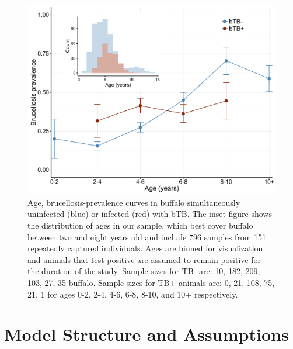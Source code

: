 \documentclass[letterpaper,12pt]{article}
\begin{document}
\begin{figure}
\begin{center}
\includegraphics[width=5in]{Figure1_ageprev}
\end{center}
\caption{Age, brucellosis-prevalence curves in buffalo simultaneously uninfected (blue) or infected (red) with bTB.  The inset figure shows the distribution of ages in our sample, which best cover buffalo between two and eight years old and include 796 samples from 151 repeatedly captured individuals.  Ages are binned for visualization and animals that test positive are assumed to remain positive for the duration of the study.  Sample sizes for TB- are: 10, 182, 209, 103, 27, 35 buffalo.  Sample sizes for TB+ animals are: 0, 21, 108, 75, 21, 1 for ages 0-2, 2-4, 4-6, 6-8, 8-10, and 10+ respectively.}
\label{fig1}
\end{figure}


\pagebreak
\section*{Model Structure and Assumptions}
\end{document}
